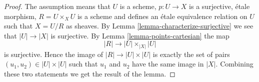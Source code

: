 \documentclass[10pt,a4paper]{amsart}
\theoremstyle{plain}
\theoremstyle{definition}
\theoremstyle{remark}
\numberwithin{equation}{subsection}
\begin{document}
\begin{proof}
The assumption means that $U$ is a scheme, $p : U \to X$ is a surjective,
\'etale morphism, $R = U \times_X U$ is a scheme and defines an \'etale
equivalence relation on $U$ such that $X = U/R$ as sheaves. By
Lemma \ref{lemma-characterize-surjective}
we see that $|U| \to |X|$ is surjective. By
Lemma \ref{lemma-points-cartesian}
the map
$$
|R| \longrightarrow |U| \times_{|X|} |U|
$$
is surjective. Hence the image of $|R| \to |U| \times |U|$ is
exactly the set of pairs $(u_1, u_2) \in |U| \times |U|$
such that $u_1$ and $u_2$ have the same image in $|X|$.
Combining these two statements we get the result of the lemma.
\end{proof}
\end{document}
